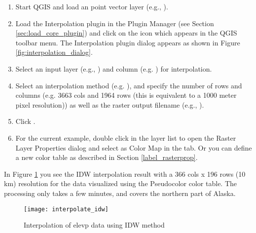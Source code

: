 \begin{enumerate}
  \item Start QGIS and load an point vector layer (e.g., ). 
  \item Load the Interpolation plugin in the Plugin Manager (see Section 
  \ref{sec:load_core_plugin}) and click on the  
  icon which appears in the QGIS toolbar menu. The Interpolation plugin dialog appears as 
  shown in Figure \ref{fig:interpolation_dialog}.
  \item Select an input layer (e.g., ) and column (e.g. ) for 
  interpolation.
  \item Select an interpolation method (e.g. ), and specify 
  the number of rows and columns (e.g. 3663 cols and 1964 rows (this is equivalent to a 1000 meter pixel resolution))
  as well as the raster output filename (e.g., ).
  \item Click .
  \item For the current example, double click  in the layer list to open the Raster Layer Properties 
  dialog and select  as Color Map in the  tab. Or you 
  can define a new color table as described in Section \ref{label_rasterprop}.
\end{enumerate}

In Figure \ref{fig:interpolation_idw} you see the IDW interpolation result with a 366 cols x 196 rows (10 km) 
resolution for the  data visualized using the Pseudocolor color table. The processing 
only takes a few minutes, and covers the northern part of Alaska.

\begin{figure}[ht]
   \begin{center}
   \caption{Interpolation of elevp data using IDW method \nixcaption}\label{fig:interpolation_idw}\smallskip
   \texttt{[image: interpolate\_idw]}
\end{center}  
\end{figure}

\newpage



